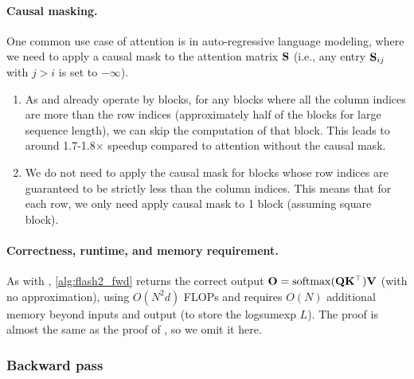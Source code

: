 \paragraph{Causal masking.}

One common use case of attention is in auto-regressive language modeling, where
we need to apply a causal mask to the attention matrix $\mathbf{S}$ (i.e., any entry
$\mathbf{S}_{ij}$ with $j > i$ is set to $-\infty$).
\begin{enumerate}
  \item As \sysnameone and \sysname already operate by blocks, for any blocks
  where all the column indices are more than the row indices (approximately half
  of the blocks for large sequence length), we can skip the computation of that
  block.
  This leads to around 1.7-1.8$\times$ speedup compared to attention without the
  causal mask.
  \item We do not need to apply the causal mask for blocks whose row indices are
  guaranteed to be strictly less than the column indices. This means that for
  each row, we only need apply causal mask to 1 block (assuming square block).
\end{enumerate}

\paragraph{Correctness, runtime, and memory requirement.}
As with \sysnameone, \cref{alg:flash2_fwd} returns the correct output
$\mathbf{O} = \mathrm{softmax}(\mathbf{Q}\mathbf{K}^\top)\mathbf{V}$ (with no approximation), using $O(N^2d)$ FLOPs and
requires $O(N)$ additional memory beyond inputs and output (to store the
logsumexp $L$).
The proof is almost the same as the proof of
\citet[Theorem 1]{dao2022flashattention}, so we omit it here.

\subsubsection{Backward pass}

